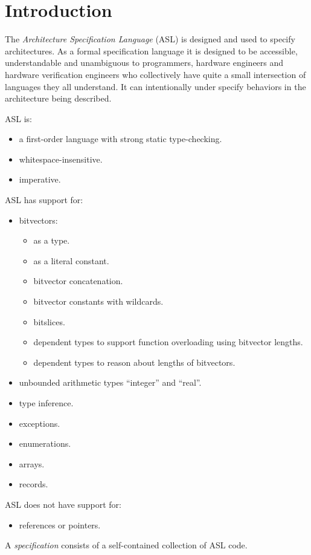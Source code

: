 \documentclass{book}
\newcommand\lrmexcerpt[2]{\cbstart #1 \cbend}
\begin{document}
\chapter{Introduction}
\lrmexcerpt{
The \emph{Architecture Specification Language} (ASL) is designed and used to specify architectures. As a formal
specification language it is designed to be accessible, understandable and unambiguous to programmers, hardware
engineers and hardware verification engineers who collectively have quite a small intersection of languages they
all understand. It can intentionally under specify behaviors in the architecture being described.

ASL is:
\begin{itemize}
\item a first-order language with strong static type-checking.
\item whitespace-insensitive.
\item imperative.
\end{itemize}

ASL has support for:
\begin{itemize}
\item bitvectors:
  \begin{itemize}
    \item as a type.
    \item as a literal constant.
    \item bitvector concatenation.
    \item bitvector constants with wildcards.
    \item bitslices.
    \item dependent types to support function overloading using bitvector lengths.
    \item dependent types to reason about lengths of bitvectors.
  \end{itemize}
\item unbounded arithmetic types ``integer'' and ``real''.
\item type inference.
\item exceptions.
\item enumerations.
\item arrays.
\item records.
\end{itemize}

ASL does not have support for:
\begin{itemize}
    \item references or pointers.
\end{itemize}

A \emph{specification} consists of a self-contained collection of ASL code.
}{16--17}
\end{document}
